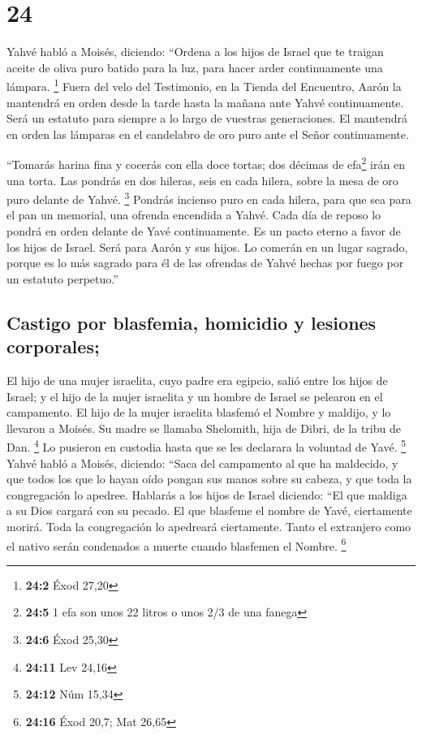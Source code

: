 \hypertarget{section-23}{%
\section{24}\label{section-23}}

 Yahvé habló a Moisés, diciendo:  ``Ordena a
los hijos de Israel que te traigan aceite de oliva puro batido para la
luz, para hacer arder continuamente una lámpara. \footnote{\textbf{24:2}
  Éxod 27,20}  Fuera del velo del Testimonio, en la Tienda
del Encuentro, Aarón la mantendrá en orden desde la tarde hasta la
mañana ante Yahvé continuamente. Será un estatuto para siempre a lo
largo de vuestras generaciones.  El mantendrá en orden las
lámparas en el candelabro de oro puro ante el Señor continuamente.

 ``Tomarás harina fina y cocerás con ella doce tortas; dos
décimas de efa\footnote{\textbf{24:5} 1 efa son unos 22 litros o unos
  2/3 de una fanega} irán en una torta.  Las pondrás en
dos hileras, seis en cada hilera, sobre la mesa de oro puro delante de
Yahvé. \footnote{\textbf{24:6} Éxod 25,30}  Pondrás
incienso puro en cada hilera, para que sea para el pan un memorial, una
ofrenda encendida a Yahvé.  Cada día de reposo lo pondrá
en orden delante de Yavé continuamente. Es un pacto eterno a favor de
los hijos de Israel.  Será para Aarón y sus hijos. Lo
comerán en un lugar sagrado, porque es lo más sagrado para él de las
ofrendas de Yahvé hechas por fuego por un estatuto perpetuo.''

\hypertarget{castigo-por-blasfemia-homicidio-y-lesiones-corporales}{%
\subsection{Castigo por blasfemia, homicidio y lesiones
corporales;}\label{castigo-por-blasfemia-homicidio-y-lesiones-corporales}}

 El hijo de una mujer israelita, cuyo padre era egipcio,
salió entre los hijos de Israel; y el hijo de la mujer israelita y un
hombre de Israel se pelearon en el campamento.  El hijo
de la mujer israelita blasfemó el Nombre y maldijo, y lo llevaron a
Moisés. Su madre se llamaba Shelomith, hija de Dibri, de la tribu de
Dan. \footnote{\textbf{24:11} Lev 24,16}  Lo pusieron en
custodia hasta que se les declarara la voluntad de Yavé. \footnote{\textbf{24:12}
  Núm 15,34}  Yahvé habló a Moisés, diciendo:
 ``Saca del campamento al que ha maldecido, y que todos
los que lo hayan oído pongan sus manos sobre su cabeza, y que toda la
congregación lo apedree.  Hablarás a los hijos de Israel
diciendo: ``El que maldiga a su Dios cargará con su pecado.
 El que blasfeme el nombre de Yavé, ciertamente morirá.
Toda la congregación lo apedreará ciertamente. Tanto el extranjero como
el nativo serán condenados a muerte cuando blasfemen el Nombre.
\footnote{\textbf{24:16} Éxod 20,7; Mat 26,65}

